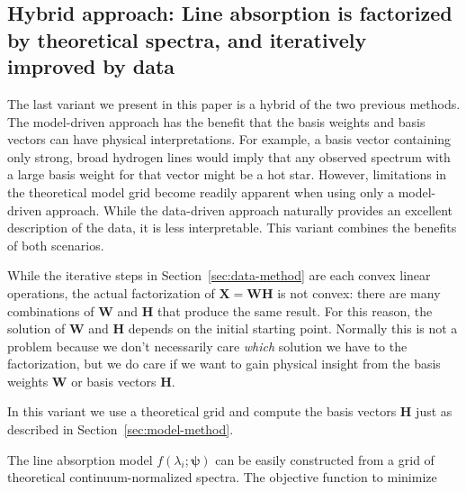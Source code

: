 \documentclass[modern]{aastex631}
\renewcommand{\vec}[1]{\mathbf{#1}}
\newcommand{\vecpsi}{\boldsymbol{\psi}}
\newcommand{\vecW}{\mathbf{W}}
\newcommand{\vecH}{\mathbf{H}}
\begin{document}
\subsection{Hybrid approach: Line absorption is factorized by theoretical spectra, and iteratively improved by data}
\label{sec:hybrid-method}

The last variant we present in this paper is a hybrid of the two previous methods. The model-driven approach has the benefit that the basis weights and basis vectors can have physical interpretations. For example, a basis vector containing only strong, broad hydrogen lines would imply that any observed spectrum with a large basis weight for that vector might be a hot star. However, limitations in the theoretical model grid become readily apparent when using only a model-driven approach. While the data-driven approach naturally provides an excellent description of the data, it is less interpretable. This variant combines the benefits of both scenarios. 

While the iterative steps in Section~\ref{sec:data-method} are each convex linear operations, the actual factorization of $\vec{X} = \vec{WH}$ is not convex: there are many combinations of $\vecW$ and $\vecH$ that produce the same result. For this reason, the solution of $\vecW$ and $\vecH$ depends on the initial starting point. Normally this is not a problem because we don't necessarily care \emph{which} solution we have to the factorization, but we do care if we want to gain physical insight from the basis weights $\vecW$ or basis vectors $\vecH$.

In this variant we use a theoretical grid and compute the basis vectors $\vecH$ just as described in Section~\ref{sec:model-method}.

The line absorption model $f(\lambda_i;\vecpsi)$ can be easily constructed from a grid of theoretical continuum-normalized spectra. 
The objective function to minimize



\end{document}
